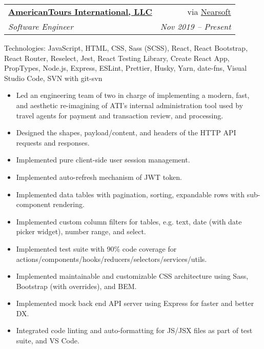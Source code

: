 \documentclass[letterpaper,11pt]{article}
\makeatletter
\newcommand{\resumeItem}[1]{
  \item\small{
    {#1 \vspace{-2pt}}
  }
}
\newcommand{\resumeSubheading}[4]{
  \vspace{0pt}\item
    \begin{tabular*}{0.97\textwidth}[t]{l@{\extracolsep{\fill}}r}
      \textbf{#1} & #2 \\
      \textit{\small#3} & \textit{\small #4}\vspace{5pt}\\
    \end{tabular*}\vspace{0pt}
}
\newcommand{\resumeItemListStart}{\begin{itemize}}
\newcommand{\resumeItemListEnd}{\end{itemize}\vspace{-5pt}}
\makeatother
\begin{document}
    \resumeSubheading
      {\href{https://americantours.com/}{AmericanTours International, LLC}}{via \href{https://nearsoft.com}{Nearsoft}}
      {Software Engineer}{Nov 2019 – Present}
      {\footnotesize Technologies: JavaScript, HTML, CSS, Sass (SCSS), React, React Bootstrap, React Router, Reselect, Jest, React Testing Library, Create React App, PropTypes, Node.js, Express, ESLint, Prettier, Husky, Yarn, date-fns, Visual Studio Code, SVN with git-svn}
      \resumeItemListStart
        \resumeItem
          {Led an engineering team of two in charge of implementing a modern, fast, and aesthetic re-imagining of ATI's internal administration tool used by travel agents for payment and transaction review, and processing.}
        \resumeItem
          {Designed the shapes, payload/content, and headers of the HTTP API requests and responses.}
        \resumeItem
          {Implemented pure client-side user session management.}
        \resumeItem
          {Implemented auto-refresh mechanism of JWT token.}
        \resumeItem
          {Implemented data tables with pagination, sorting, expandable rows with sub-component rendering.}
        \resumeItem
          {Implemented custom column filters for tables, e.g. text, date (with date picker widget), number range, and select.}
        \resumeItem
          {Implemented test suite with 90\% code coverage for actions/components/hooks/reducers/selectors/services/utils.}
        \resumeItem
          {Implemented maintainable and customizable CSS architecture using Sass, Bootstrap (with overrides), and BEM.}
        \resumeItem
          {Implemented mock back end API server using Express for faster and better DX.}
        \resumeItem
          {Integrated code linting and auto-formatting for JS/JSX files as part of test suite, and VS Code.}
      \resumeItemListEnd
\end{document}
